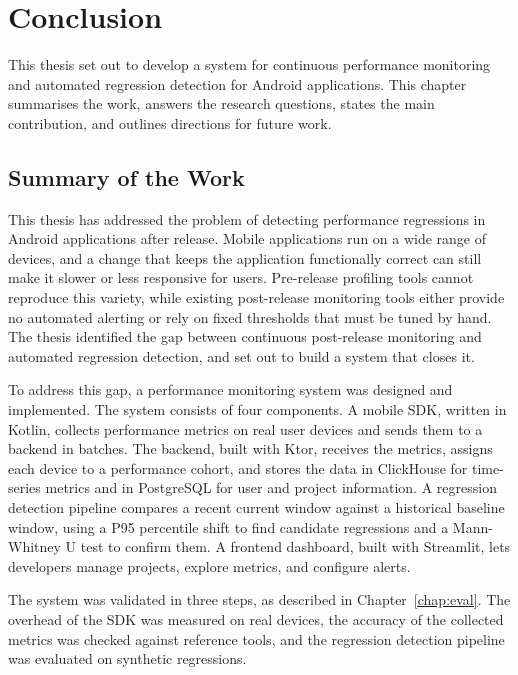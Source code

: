 \chapter{Conclusion}
\label{chap:conclusion}

This thesis set out to develop a system for continuous performance monitoring and automated regression detection for Android applications. This chapter summarises the work, answers the research questions, states the main contribution, and outlines directions for future work.

\section{Summary of the Work}
\label{sec:concl_summary}

This thesis has addressed the problem of detecting performance regressions in Android applications after release. Mobile applications run on a wide range of devices, and a change that keeps the application functionally correct can still make it slower or less responsive for users. Pre-release profiling tools cannot reproduce this variety, while existing post-release monitoring tools either provide no automated alerting or rely on fixed thresholds that must be tuned by hand. The thesis identified the gap between continuous post-release monitoring and automated regression detection, and set out to build a system that closes it.

To address this gap, a performance monitoring system was designed and implemented. The system consists of four components. A mobile SDK, written in Kotlin, collects performance metrics on real user devices and sends them to a backend in batches. The backend, built with Ktor, receives the metrics, assigns each device to a performance cohort, and stores the data in ClickHouse for time-series metrics and in PostgreSQL for user and project information. A regression detection pipeline compares a recent current window against a historical baseline window, using a P95 percentile shift to find candidate regressions and a Mann-Whitney U test to confirm them. A frontend dashboard, built with Streamlit, lets developers manage projects, explore metrics, and configure alerts.

The system was validated in three steps, as described in Chapter~\ref{chap:eval}. The overhead of the SDK was measured on real devices, the accuracy of the collected metrics was checked against reference tools, and the regression detection pipeline was evaluated on synthetic regressions.

